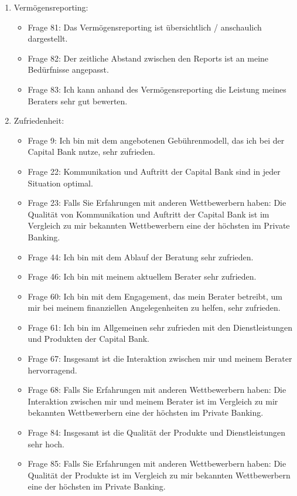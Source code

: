\documentclass{article}\usepackage[]{graphicx}\usepackage[]{color}
\begin{document}
\begin{enumerate}
        \item Vermögensreporting:
    \begin{itemize}
    \item Frage 81:
    Das Vermögensreporting ist übersichtlich / anschaulich dargestellt.
    \item Frage 82:
    Der zeitliche Abstand zwischen den Reports ist an meine Bedürfnisse angepasst.
    \item Frage 83:
    Ich kann anhand des Vermögensreporting die Leistung meines Beraters sehr gut bewerten.
    \end{itemize}
    
        \item Zufriedenheit:
    \begin{itemize}

    \item Frage 9:
    Ich bin mit dem angebotenen Gebührenmodell, das ich bei der Capital Bank nutze, sehr zufrieden.
    \item Frage 22:
    Kommunikation und Auftritt der Capital Bank sind in jeder Situation optimal.
    \item Frage 23:
    Falls Sie Erfahrungen mit anderen Wettbewerbern haben: Die Qualität von Kommunikation und Auftritt der Capital Bank ist im Vergleich zu mir bekannten Wettbewerbern eine der höchsten im Private Banking.
    \item Frage 44:
    Ich bin mit dem Ablauf der Beratung sehr zufrieden.
    \item Frage 46:
    Ich bin mit meinem aktuellem Berater sehr zufrieden.
    \item Frage 60:
    Ich bin mit dem Engagement, das mein Berater betreibt, um mir bei meinem finanziellen Angelegenheiten zu helfen, sehr zufrieden.
    \item Frage 61:
    Ich bin im Allgemeinen sehr zufrieden mit den Dienstleistungen und Produkten der Capital Bank.
    \item Frage 67:
    Insgesamt ist die Interaktion zwischen mir und meinem Berater hervorragend.
    \item Frage 68:
    Falls Sie Erfahrungen mit anderen Wettbewerbern haben: Die Interaktion zwischen mir und meinem Berater ist im Vergleich zu mir bekannten Wettbewerbern eine der höchsten im Private Banking.
    \item Frage 84:
    Insgesamt ist die Qualität der Produkte und Dienstleistungen sehr hoch.
    \item Frage 85:
    Falls Sie Erfahrungen mit anderen Wettbewerbern haben: Die Qualität der Produkte ist im Vergleich zu mir bekannten Wettbewerbern eine der höchsten im Private Banking.

\end{itemize}
\end{enumerate}
\end{document}
